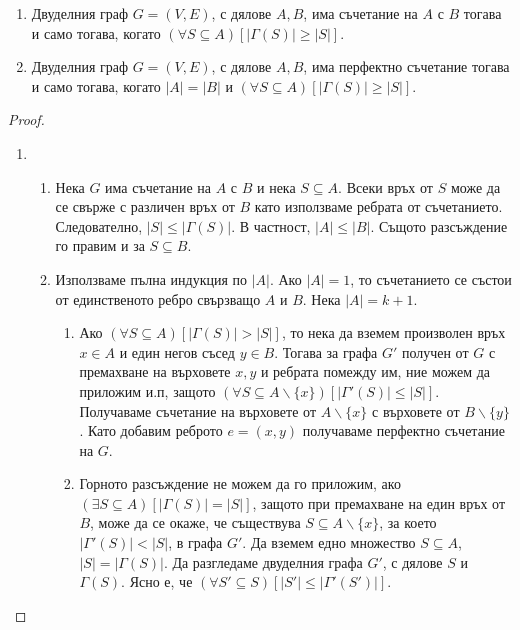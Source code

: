 \begin{problem}
  \begin{enumerate}
  \item
    Двуделния граф $G=(V,E)$, с дялове $A,B$, има съчетание на $A$ с $B$ тогава и само тогава, когато
    $(\forall S\subseteq A)[|\Gamma(S)| \geq |S|]$.
  \item
    Двуделния граф $G=(V,E)$, с дялове $A,B$, има перфектно съчетание тогава и само тогава, когато
    $|A| = |B|$ и $(\forall S\subseteq A)[|\Gamma(S)| \geq |S|]$.
\end{enumerate}

\end{problem}
\begin{proof}
  \begin{enumerate}
  \item
    \begin{enumerate}
    \item
      Нека $G$ има съчетание на $A$ с $B$ и нека $S\subseteq A$.
      Всеки връх от $S$ може да се свърже с различен връх от $B$ като използваме ребрата от съчетанието.
      Следователно, $|S| \leq |\Gamma(S)|$. В частност, $|A| \leq |B|$.
      Същото разсъждение го правим и за $S\subseteq B$.
    \item
      Използваме пълна индукция по $|A|$.
      Ако $|A| = 1$, то съчетанието се състои от единственото ребро свързващо $A$ и $B$.
      Нека $|A| = k+1$.
      \begin{enumerate}
      \item
        Ако $(\forall S\subseteq A)[|\Gamma(S)| > |S|]$, то нека да вземем произволен връх $x\in A$ и един негов съсед $y\in B$.
        Тогава за графа $G'$ получен от $G$ с премахване на върховете $x,y$ и ребрата помежду им, ние можем да приложим и.п,
        защото $(\forall S\subseteq A\backslash\{x\})[|\Gamma'(S)| \leq |S|]$.
        Получаваме съчетание на върховете от $A\backslash\{x\}$ с върховете от $B\backslash\{y\}$.
        Като добавим реброто $e = (x,y)$ получаваме перфектно съчетание на $G$.
      \item
        Горното разсъждение не можем да го приложим, ако $(\exists S\subseteq A)[|\Gamma(S)| = |S|]$, 
        защото при премахване на един връх от $B$, може да се окаже, 
        че съществува $S\subseteq A\backslash\{x\}$, 
        за което $|\Gamma'(S)| < |S|$, в графа $G'$.
        Да вземем едно множество $S\subseteq A$, $|S| = |\Gamma(S)|$.
        Да разгледаме двуделния графа $G'$, с дялове $S$ и $\Gamma(S)$.
        Ясно е, че $(\forall S'\subseteq S)[|S'| \leq |\Gamma'(S')|]$.

\end{enumerate}
\end{enumerate}
\end{enumerate}
\end{proof}
